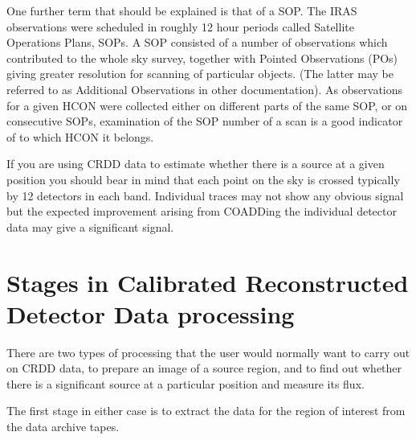 \documentclass[twoside,11pt]{starlink}
\begin{document}
One further term that should be explained is that of a SOP. The IRAS
observations were scheduled in roughly 12 hour periods called Satellite
Operations Plans, SOPs. A SOP consisted of a number of observations which
contributed to the whole sky survey, together with Pointed Observations (POs)
giving greater resolution for scanning of particular objects. (The latter may be
referred to as Additional Observations in other documentation). As observations
for a given HCON were collected either on different parts of the same SOP, or
on consecutive SOPs, examination of the SOP number of a scan is a good indicator
of to which HCON it belongs.

If you are using CRDD data to estimate whether there is a source at a given
position you should bear in mind that each point on the sky is crossed
typically by 12 detectors in each band. Individual traces may not show any
obvious signal but the expected improvement arising from COADDing the
individual detector data may give a significant signal.

\section{Stages in Calibrated Reconstructed Detector Data processing
\label{m:stagcrdd}}

There are two types of processing that the user would normally want to carry
out on CRDD data, to prepare an image of a source region, and to find out
whether there is a significant source at a particular position and measure its
flux.

The first stage in either case is to extract the data for the region of
interest from the data archive tapes.
\end{document}
